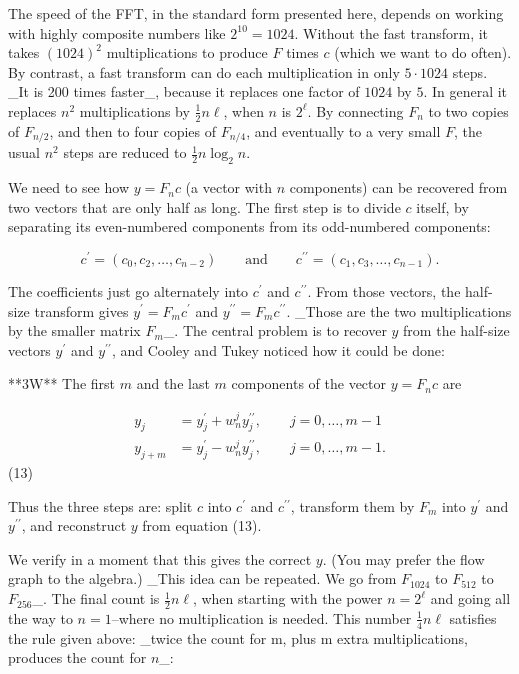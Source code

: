 The speed of the FFT, in the standard form presented here, depends on working with highly composite numbers like \(2^{10}=1024\). Without the fast transform, it takes \((1024)^{2}\) multiplications to produce \(F\) times \(c\) (which we want to do often). By contrast, a fast transform can do each multiplication in only \(5\cdot 1024\) steps. _It is 200 times faster_, because it replaces one factor of \(1024\) by \(5\). In general it replaces \(n^{2}\) multiplications by \(\frac{1}{2}n\ell\), when \(n\) is \(2^{\ell}\). By connecting \(F_{n}\) to two copies of \(F_{n/2}\), and then to four copies of \(F_{n/4}\), and eventually to a very small \(F\), the usual \(n^{2}\) steps are reduced to \(\frac{1}{2}n\log_{2}n\).

We need to see how \(y=F_{n}c\) (a vector with \(n\) components) can be recovered from two vectors that are only half as long. The first step is to divide \(c\) itself, by separating its even-numbered components from its odd-numbered components:

\[c^{\prime}=(c_{0},c_{2},\ldots,c_{n-2})\qquad\text{and}\qquad c^{\prime\prime} =(c_{1},c_{3},\ldots,c_{n-1}).\]

The coefficients just go alternately into \(c^{\prime}\) and \(c^{\prime\prime}\). From those vectors, the half-size transform gives \(y^{\prime}=F_{m}c^{\prime}\) and \(y^{\prime\prime}=F_{m}c^{\prime\prime}\). _Those are the two multiplications by the smaller matrix \(F_{m}\)_. The central problem is to recover \(y\) from the half-size vectors \(y^{\prime}\) and \(y^{\prime\prime}\), and Cooley and Tukey noticed how it could be done:

**3W** The first \(m\) and the last \(m\) components of the vector \(y=F_{n}c\) are

\[\begin{split} y_{j}&=y^{\prime}_{j}+w^{j}_{n}y^{ \prime\prime}_{j},\qquad j=0,\ldots,m-1\\ y_{j+m}&=y^{\prime}_{j}-w^{j}_{n}y^{\prime\prime}_{ j},\qquad j=0,\ldots,m-1.\end{split}\] (13)

Thus the three steps are: split \(c\) into \(c^{\prime}\) and \(c^{\prime\prime}\), transform them by \(F_{m}\) into \(y^{\prime}\) and \(y^{\prime\prime}\), and reconstruct \(y\) from equation (13).

We verify in a moment that this gives the correct \(y\). (You may prefer the flow graph to the algebra.) _This idea can be repeated. We go from \(F_{1024}\) to \(F_{512}\) to \(F_{256}\)_. The final count is \(\frac{1}{2}n\ell\), when starting with the power \(n=2^{\ell}\) and going all the way to \(n=1\)--where no multiplication is needed. This number \(\frac{1}{4}n\ell\) satisfies the rule given above: _twice the count for m, plus m extra multiplications, produces the count for \(n\)_:

